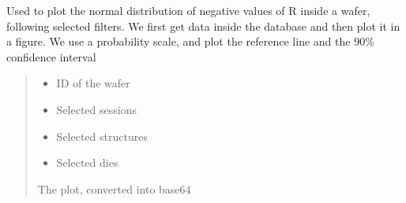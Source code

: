 \documentclass[letterpaper,10pt,english]{sphinxmanual}
\begin{document}
\begin{fulllineitems}
\label{\detokenize{normal_plots:normal_plots.R_normal_distrib_neg}}
\pysigstartsignatures
{}
\pysigstopsignatures
\sphinxAtStartPar
Used to plot the normal distribution of negative values of R inside a wafer, following selected filters.
We first get data inside the database and then plot it in a figure. We use a probability scale, and plot the reference line and the 90\% confidence interval
\begin{quote}\begin{description}
\begin{itemize}
\item {} 
\sphinxAtStartPar
{} \textendash{} ID of the wafer

\item {} 
\sphinxAtStartPar
{} \textendash{} Selected sessions

\item {} 
\sphinxAtStartPar
{} \textendash{} Selected structures

\item {} 
\sphinxAtStartPar
{} \textendash{} Selected dies

\end{itemize}

\sphinxAtStartPar
The plot, converted into base64

\end{description}\end{quote}

\end{fulllineitems}

\end{document}
